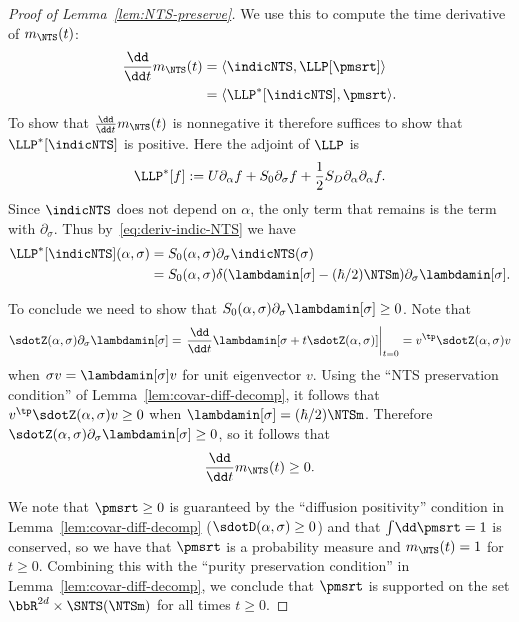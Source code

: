 \documentclass{article}
\numberwithin{equation}{section}
\begin{document}
\begin{proof}[Proof of Lemma~\ref{lem:NTS-preserve}]
We use this to 
compute the time derivative of
$m_{\NTS}(t)$:
\begin{align*}
\frac{\dd}{\dd t} m_{\NTS}(t) &=
\langle \indicNTS, \LLP[\pmsrt]\rangle \\
&= \langle \LLP^*[\indicNTS], \pmsrt\rangle.
\end{align*}
To show that $\frac{\dd}{\dd t}m_{\NTS}(t)$ is
nonnegative it therefore suffices
to show that $\LLP^*[\indicNTS]$ is positive.
Here the adjoint of $\LLP$ is
\begin{equation}
\LLP^*[f] := U \partial_\alpha f
+ S_0 \partial_\sigma f
+ \frac12 S_D \partial_\alpha\partial_\alpha f.
\end{equation}
Since $\indicNTS$ does not depend on $\alpha$, the only term that 
remains is the term with $\partial_\sigma$.  Thus by~\eqref{eq:deriv-indic-NTS} we have
\begin{equation}
\begin{split}
\LLP^*[\indicNTS](\alpha,\sigma) & = S_0(\alpha,\sigma)\partial_\sigma \indicNTS(\sigma) \\
&= S_0(\alpha,\sigma) \delta(\lambdamin[\sigma] - (\hbar/2)\NTSm)
\partial_\sigma\lambdamin[\sigma].
\end{split}
\end{equation}

To conclude we need to show that 
$S_0(\alpha,\sigma)\partial_\sigma \lambdamin[\sigma] \geq 0$.  Note that
\begin{equation}
    \sdotZ(\alpha,\sigma) \partial_\sigma \lambdamin[\sigma] =
    \left.\frac{\dd}{\dd t}
    \lambdamin[\sigma + t \sdotZ(\alpha,\sigma)]\right|_{t=0}
    =
    v^\tp \sdotZ(\alpha,\sigma) v
\end{equation}
when $\sigma v = \lambdamin[\sigma] v$ for 
unit eigenvector $v$.
Using the ``NTS preservation condition'' of Lemma~\ref{lem:covar-diff-decomp}, it follows
that 
$v^\tp \sdotZ(\alpha,\sigma) v \geq 0$ 
when $\lambdamin[\sigma]=(\hbar/2)\NTSm$.  Therefore
$\sdotZ(\alpha,\sigma)\partial_\sigma \lambdamin[\sigma] \geq 0$,
so it follows that 
\begin{equation}
    \frac{\dd}{\dd t} m_{\NTS}(t) \geq 0.
\end{equation}



We note that $\pmsrt\geq 0$ is guaranteed by the ``diffusion positivity'' condition in Lemma~\ref{lem:covar-diff-decomp} ($\sdotD(\alpha,\sigma)\ge 0$) and that $\int \! \dd \pmsrt = 1$ is conserved, so we have that $\pmsrt$ is a probability measure and $m_{\NTS}(t) = 1$ for $t\geq 0$. Combining this with the ``purity preservation condition'' in Lemma~\ref{lem:covar-diff-decomp}, we conclude that $\pmsrt$ is supported on the set $\bbR^{2d}\times\SNTS(\NTSm)$ for all times $t\geq 0$. 

\end{proof}
\end{document}
